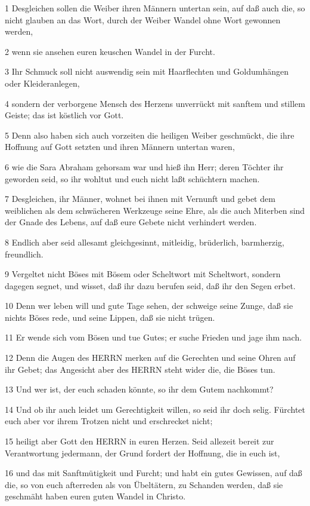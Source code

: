 \par 1 Desgleichen sollen die Weiber ihren Männern untertan sein, auf daß auch die, so nicht glauben an das Wort, durch der Weiber Wandel ohne Wort gewonnen werden,
\par 2 wenn sie ansehen euren keuschen Wandel in der Furcht.
\par 3 Ihr Schmuck soll nicht auswendig sein mit Haarflechten und Goldumhängen oder Kleideranlegen,
\par 4 sondern der verborgene Mensch des Herzens unverrückt mit sanftem und stillem Geiste; das ist köstlich vor Gott.
\par 5 Denn also haben sich auch vorzeiten die heiligen Weiber geschmückt, die ihre Hoffnung auf Gott setzten und ihren Männern untertan waren,
\par 6 wie die Sara Abraham gehorsam war und hieß ihn Herr; deren Töchter ihr geworden seid, so ihr wohltut und euch nicht laßt schüchtern machen.
\par 7 Desgleichen, ihr Männer, wohnet bei ihnen mit Vernunft und gebet dem weiblichen als dem schwächeren Werkzeuge seine Ehre, als die auch Miterben sind der Gnade des Lebens, auf daß eure Gebete nicht verhindert werden.
\par 8 Endlich aber seid allesamt gleichgesinnt, mitleidig, brüderlich, barmherzig, freundlich.
\par 9 Vergeltet nicht Böses mit Bösem oder Scheltwort mit Scheltwort, sondern dagegen segnet, und wisset, daß ihr dazu berufen seid, daß ihr den Segen erbet.
\par 10 Denn wer leben will und gute Tage sehen, der schweige seine Zunge, daß sie nichts Böses rede, und seine Lippen, daß sie nicht trügen.
\par 11 Er wende sich vom Bösen und tue Gutes; er suche Frieden und jage ihm nach.
\par 12 Denn die Augen des HERRN merken auf die Gerechten und seine Ohren auf ihr Gebet; das Angesicht aber des HERRN steht wider die, die Böses tun.
\par 13 Und wer ist, der euch schaden könnte, so ihr dem Gutem nachkommt?
\par 14 Und ob ihr auch leidet um Gerechtigkeit willen, so seid ihr doch selig. Fürchtet euch aber vor ihrem Trotzen nicht und erschrecket nicht;
\par 15 heiligt aber Gott den HERRN in euren Herzen. Seid allezeit bereit zur Verantwortung jedermann, der Grund fordert der Hoffnung, die in euch ist,
\par 16 und das mit Sanftmütigkeit und Furcht; und habt ein gutes Gewissen, auf daß die, so von euch afterreden als von Übeltätern, zu Schanden werden, daß sie geschmäht haben euren guten Wandel in Christo.
